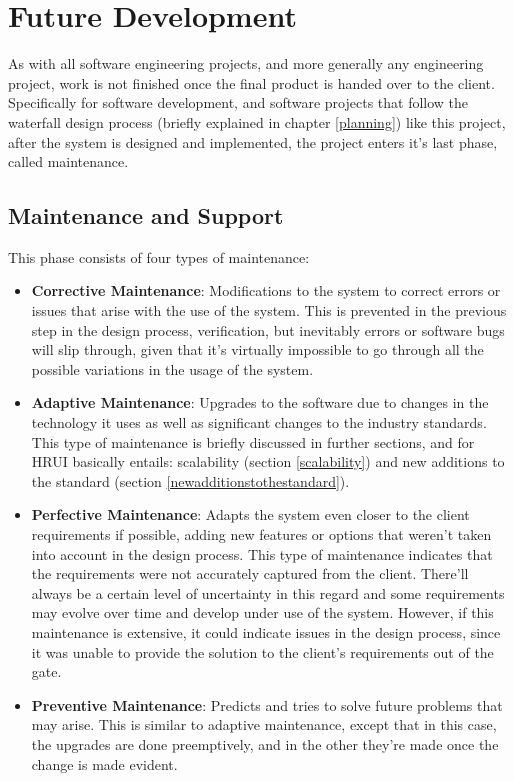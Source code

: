 \chapter{Future Development} \label{futuredevelopment}
As with all software engineering projects, and more generally any engineering project, work is not finished once the final 
product is handed over to the client. Specifically for software development, and software projects that follow the waterfall 
design process (briefly explained in chapter \ref{planning}) like this project, after the system is designed and implemented, 
the project enters it's last phase, called maintenance.\\
\section{Maintenance and Support}
This phase consists of four types of maintenance:
\begin{itemize}
	\item \textbf{Corrective Maintenance}: Modifications to the system to correct errors or issues that arise with the use of 
	the system. This is prevented in the previous step in the design process, verification, but inevitably errors or software 
	bugs will slip through, given that it's virtually impossible to go through all the possible variations in the usage of the 
	system.
	\item \textbf{Adaptive Maintenance}: Upgrades to the software due to changes in the technology it uses as well as 
	significant changes to the industry standards. This type of maintenance is briefly discussed in further sections, and for 
	HRUI basically entails: scalability (section \ref{scalability}) and new additions to the standard (section 
	\ref{newadditionstothestandard}).
	\item \textbf{Perfective Maintenance}: Adapts the system even closer to the client requirements if possible, adding new 
	features or options that weren't taken into account in the design process. This type of maintenance indicates that the 
	requirements were not accurately captured from the client. There'll always be a certain level of uncertainty in this regard 
	and some requirements may evolve over time and develop under use of the system. However, if this maintenance is extensive, 
	it could indicate issues in the design process, since it was unable to provide the solution to the client's requirements out 
	of the gate.
	\item \textbf{Preventive Maintenance}: Predicts and tries to solve future problems that may arise. This is similar to 
	adaptive maintenance, except that in this case, the upgrades are done preemptively, and in the other they're made once the 
	change is made evident. 
\end{itemize}
